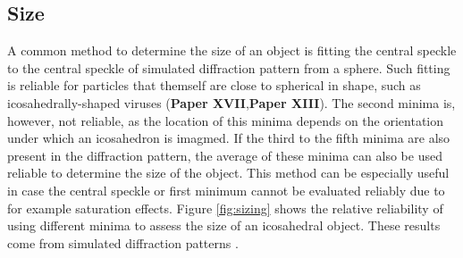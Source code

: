 \subsection{Size}
A common method to determine the size of an object is fitting the central speckle to the central speckle of simulated diffraction pattern from a sphere. Such fitting is reliable for particles that themself are close to spherical in shape, such as icosahedrally-shaped viruses (\textbf{Paper XVII},\textbf{Paper XIII}). The second minima is, however, not reliable, as the location of this minima depends on the orientation under which an icosahedron is imagmed. If the third to the fifth minima are also present in the diffraction pattern, the average of these minima can also be used reliable to determine the size of the object. This method can be especially useful in case the central speckle or first minimum cannot be evaluated reliably due to for example saturation effects. Figure \ref{fig:sizing} shows the relative reliability of using different minima to assess the size of an icosahedral object. These results come from simulated diffraction patterns \cite{Hantke2016}.

